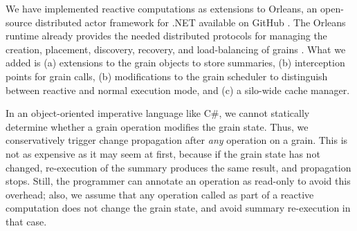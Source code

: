 We have implemented reactive computations as extensions to Orleans, an open-source distributed actor framework for .NET available on GitHub \cite{orleans}. The Orleans runtime already provides the needed distributed protocols for managing the creation, placement, discovery, recovery, and load-balancing of grains \cite{orleans-socc,orleanstr}. What we added is (a) extensions to the grain objects to store summaries, (b) interception points for grain calls, (b) modifications to the grain scheduler to distinguish between reactive and normal execution mode, and (c) a silo-wide cache manager. 

In an object-oriented imperative language like C\#, we cannot statically determine whether a grain operation modifies the grain state. Thus, we conservatively trigger change propagation after \emph{any} operation on a grain. This is not as expensive as it may seem at first, because if the grain state has not changed, re-execution of the summary produces the same result, and propagation stops. Still, the programmer can annotate an operation as read-only to avoid this overhead; also, we assume that any operation called as part of a reactive computation does not change the grain state, and avoid summary re-execution in that case.

